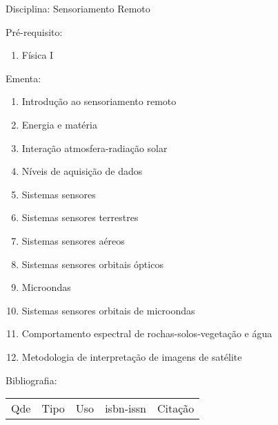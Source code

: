 \documentclass[12pt,a4paper,twoside]{report}
\begin{document}
Disciplina: Sensoriamento Remoto

Pré-requisito:
\begin{enumerate}
\item Física I
\end{enumerate}

Ementa:
\begin{enumerate}
\item Introdução ao sensoriamento remoto
\item Energia e matéria
\item Interação atmosfera-radiação solar
\item Níveis de aquisição de dados
\item Sistemas sensores
\item Sistemas sensores terrestres
\item Sistemas sensores aéreos
\item Sistemas sensores orbitais ópticos
\item Microondas
\item Sistemas sensores orbitais de microondas
\item Comportamento espectral de rochas-solos-vegetação e água
\item Metodologia de interpretação de imagens de satélite
\end{enumerate}

Bibliografia:
\begin{tabular}{lllll}
Qde & Tipo & Uso & isbn-issn & Citação \\
\end{tabular}
\end{document}

